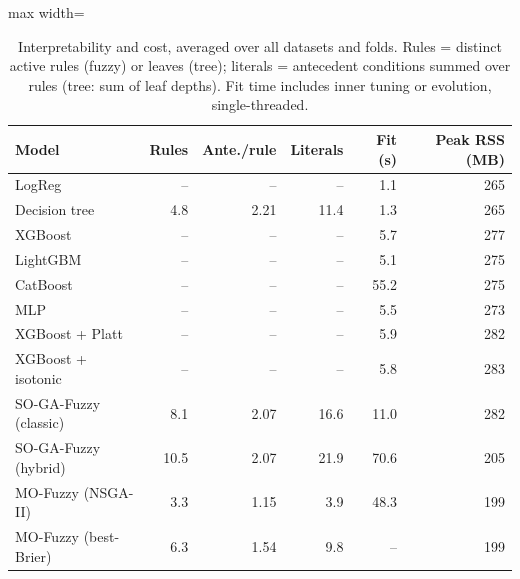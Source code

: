 \begin{table}[t]
\centering
\scriptsize
\setlength{\tabcolsep}{3pt}
\caption{Interpretability and cost, averaged over all datasets and folds. Rules = distinct active rules (fuzzy) or leaves (tree); literals = antecedent conditions summed over rules (tree: sum of leaf depths). Fit time includes inner tuning or evolution, single-threaded.}
\label{tab:complexity}
\begin{adjustbox}{max width=\linewidth}
\begin{tabular}{lrrrrr}
\toprule
Model & Rules & Ante./rule & Literals & Fit (s) & Peak RSS (MB) \\
\midrule
LogReg & -- & -- & -- & 1.1 & 265 \\
Decision tree & 4.8 & 2.21 & 11.4 & 1.3 & 265 \\
XGBoost & -- & -- & -- & 5.7 & 277 \\
LightGBM & -- & -- & -- & 5.1 & 275 \\
CatBoost & -- & -- & -- & 55.2 & 275 \\
MLP & -- & -- & -- & 5.5 & 273 \\
XGBoost + Platt & -- & -- & -- & 5.9 & 282 \\
XGBoost + isotonic & -- & -- & -- & 5.8 & 283 \\
SO-GA-Fuzzy (classic) & 8.1 & 2.07 & 16.6 & 11.0 & 282 \\
SO-GA-Fuzzy (hybrid) & 10.5 & 2.07 & 21.9 & 70.6 & 205 \\
MO-Fuzzy (NSGA-II) & 3.3 & 1.15 & 3.9 & 48.3 & 199 \\
MO-Fuzzy (best-Brier) & 6.3 & 1.54 & 9.8 & -- & 199 \\
\bottomrule
\end{tabular}
\end{adjustbox}
\end{table}
